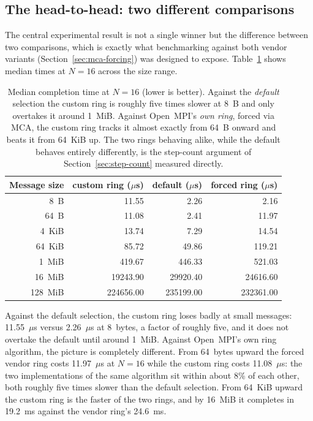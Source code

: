 \subsection{The head-to-head: two different comparisons}
\label{sec:head-to-head}

The central experimental result is not a single winner but the difference between two comparisons, which is exactly what benchmarking against both vendor variants (Section~\ref{sec:mca-forcing}) was designed to expose. Table~\ref{tab:headtohead} shows median times at $N=16$ across the size range.

\begin{table}[htbp]
\centering
\begin{tabular}{rrrr}
\toprule
Message size & custom ring ($\mu$s) & default ($\mu$s) & forced ring ($\mu$s) \\
\midrule
8~B      & 11.55     & 2.26      & 2.16 \\
64~B     & 11.08     & 2.41      & 11.97 \\
4~KiB    & 13.74     & 7.29      & 14.54 \\
64~KiB   & 85.72     & 49.86     & 119.21 \\
1~MiB    & 419.67    & 446.33    & 521.03 \\
16~MiB   & 19243.90  & 29920.40  & 24616.60 \\
128~MiB  & 224656.00 & 235199.00 & 232361.00 \\
\bottomrule
\end{tabular}
\caption{Median completion time at $N=16$ (lower is better). Against the \emph{default} selection the custom ring is roughly five times slower at 8~B and only overtakes it around 1~MiB. Against Open~MPI's \emph{own ring}, forced via MCA, the custom ring tracks it almost exactly from 64~B onward and beats it from 64~KiB up. The two rings behaving alike, while the default behaves entirely differently, is the step-count argument of Section~\ref{sec:step-count} measured directly.}
\label{tab:headtohead}
\end{table}

Against the default selection, the custom ring loses badly at small messages: 11.55~$\mu$s versus 2.26~$\mu$s at 8~bytes, a factor of roughly five, and it does not overtake the default until around 1~MiB. Against Open~MPI's own ring algorithm, the picture is completely different. From 64~bytes upward the forced vendor ring costs 11.97~$\mu$s at $N=16$ while the custom ring costs 11.08~$\mu$s: the two implementations of the same algorithm sit within about 8\% of each other, both roughly five times slower than the default selection. From 64~KiB upward the custom ring is the faster of the two rings, and by 16~MiB it completes in 19.2~ms against the vendor ring's 24.6~ms.

